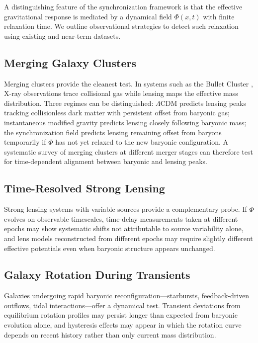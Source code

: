 \documentclass[11pt, a4paper, twocolumn]{article}
\begin{document}
A distinguishing feature of the synchronization framework is that the effective
gravitational response is mediated by a dynamical field $\Phi(x,t)$ with finite
relaxation time. We outline observational strategies to detect such relaxation
using existing and near-term datasets.

\subsection{Merging Galaxy Clusters}

Merging clusters provide the cleanest test. In systems such as the Bullet
Cluster \cite{clowe2006}, X-ray observations trace collisional gas while
lensing maps the effective mass distribution. Three regimes can be
distinguished: $\Lambda$CDM predicts lensing peaks tracking collisionless dark
matter with persistent offset from baryonic gas; instantaneous modified gravity
predicts lensing closely following baryonic mass; the synchronization field
predicts lensing remaining offset from baryons temporarily if $\Phi$ has not
yet relaxed to the new baryonic configuration. A systematic survey of merging
clusters at different merger stages can therefore test for time-dependent
alignment between baryonic and lensing peaks.

\subsection{Time-Resolved Strong Lensing}

Strong lensing systems with variable sources provide a complementary probe.
If $\Phi$ evolves on observable timescales, time-delay measurements taken at
different epochs may show systematic shifts not attributable to source
variability alone, and lens models reconstructed from different epochs may
require slightly different effective potentials even when baryonic structure
appears unchanged.

\subsection{Galaxy Rotation During Transients}

Galaxies undergoing rapid baryonic reconfiguration---starbursts,
feedback-driven outflows, tidal interactions---offer a dynamical test.
Transient deviations from equilibrium rotation profiles may persist longer
than expected from baryonic evolution alone, and hysteresis effects may appear
in which the rotation curve depends on recent history rather than only current
mass distribution.
\end{document}
